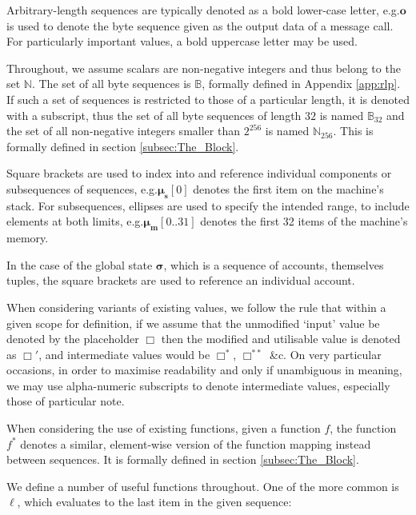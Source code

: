 \documentclass[9pt,oneside]{amsart}
\makeatletter
\newcommand{\linkdest}[1]{\Hy@raisedlink{\hypertarget{#1}{}}}
\newcommand*\eg{e.g.\@\xspace}
\makeatother
\begin{document}
\begin{multicols}{2}
Arbitrary-length sequences are typically denoted as a bold lower-case letter, \eg $\mathbf{o}$ is used to denote the byte sequence given as the output data of a message call. For particularly important values, a bold uppercase letter may be used.

Throughout, we assume scalars are non-negative integers and thus belong to the set $\mathbb{N}$. The set of all byte sequences is $\mathbb{B}$, formally defined in Appendix \ref{app:rlp}. If such a set of sequences is restricted to those of a particular length, it is denoted with a subscript, thus the set of all byte sequences of length $32$ is named $\mathbb{B}_{32}$ and the set of all non-negative integers smaller than $2^{256}$ is named $\mathbb{N}_{256}$. This is formally defined in section \hyperlink{block}{\ref{subsec:The_Block}}.

Square brackets are used to index into and reference individual components or subsequences of sequences, \eg $\boldsymbol{\mu}_{\mathbf{s}}[0]$ denotes the first item on the machine's stack. For subsequences, ellipses are used to specify the intended range, to include elements at both limits, \eg $\boldsymbol{\mu}_{\mathbf{m}}[0..31]$ denotes the first 32 items of the machine's memory.

In the case of the global state $\boldsymbol{\sigma}$, which is a sequence of accounts, themselves tuples, the square brackets are used to reference an individual account.

When considering variants of existing values, we follow the rule that within a given scope for definition, if we assume that the unmodified `input' value be denoted by the placeholder $\Box$ then the modified and utilisable value is denoted as $\Box'$, and intermediate values would be $\Box^*$,  $\Box^{**}$ \&c. On very particular occasions, in order to maximise readability and only if unambiguous in meaning, we may use alpha-numeric subscripts to denote intermediate values, especially those of particular note.

When considering the use of existing functions, given a function $f$, the function \hyperlink{general_element_wise_sequence_transformation_f_pow_asterisk}{$f^*$} denotes a similar, element-wise version of the function mapping instead between sequences. It is formally defined in section \hyperlink{block}{\ref{subsec:The_Block}}.

We define a number of useful functions throughout. \linkdest{ell}One of the more common is $\ell$, which evaluates to the last item in the given sequence:


\end{multicols}
\end{document}
